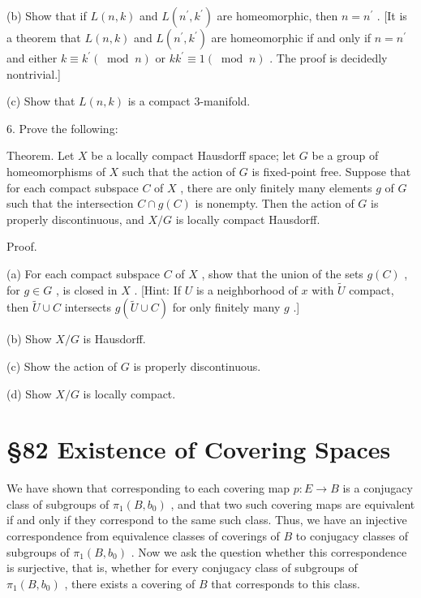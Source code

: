 \documentclass[10pt]{article}
\begin{document}
(b) Show that if \(L\left( {n,k}\right)\) and \(L\left( {{n}^{\prime },{k}^{\prime }}\right)\) are homeomorphic, then \(n = {n}^{\prime }\) . [It is a theorem that \(L\left( {n,k}\right)\) and \(L\left( {{n}^{\prime },{k}^{\prime }}\right)\) are homeomorphic if and only if \(n = {n}^{\prime }\) and either \(k \equiv  {k}^{\prime }\left( {\;\operatorname{mod}\;n}\right)\) or \(k{k}^{\prime } \equiv  1\left( {\;\operatorname{mod}\;n}\right)\) . The proof is decidedly nontrivial.]

(c) Show that \(L\left( {n,k}\right)\) is a compact 3-manifold.

6. Prove the following:

Theorem. Let \(X\) be a locally compact Hausdorff space; let \(G\) be a group of homeomorphisms of \(X\) such that the action of \(G\) is fixed-point free. Suppose that for each compact subspace \(C\) of \(X\) , there are only finitely many elements \(g\) of \(G\) such that the intersection \(C \cap  g\left( C\right)\) is nonempty. Then the action of \(G\) is properly discontinuous, and \(X/G\) is locally compact Hausdorff.

Proof.

(a) For each compact subspace \(C\) of \(X\) , show that the union of the sets \(g\left( C\right)\) , for \(g \in  G\) , is closed in \(X\) . [Hint: If \(U\) is a neighborhood of \(x\) with \(\widetilde{U}\) compact, then \(\widetilde{U} \cup  C\) intersects \(g\left( {\widetilde{U} \cup  C}\right)\) for only finitely many \(g\) .]

(b) Show \(X/G\) is Hausdorff.

(c) Show the action of \(G\) is properly discontinuous.

(d) Show \(X/G\) is locally compact.

\section*{§82 Existence of Covering Spaces}

We have shown that corresponding to each covering map \(p : E \rightarrow  B\) is a conjugacy class of subgroups of \({\pi }_{1}\left( {B,{b}_{0}}\right)\) , and that two such covering maps are equivalent if and only if they correspond to the same such class. Thus, we have an injective correspondence from equivalence classes of coverings of \(B\) to conjugacy classes of subgroups of \({\pi }_{1}\left( {B,{b}_{0}}\right)\) . Now we ask the question whether this correspondence is surjective, that is, whether for every conjugacy class of subgroups of \({\pi }_{1}\left( {B,{b}_{0}}\right)\) , there exists a covering of \(B\) that corresponds to this class.
\end{document}
